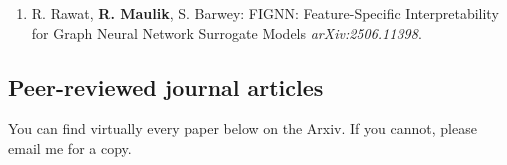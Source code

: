 \documentclass[letterpaper]{article}
\begin{document}
\begin{enumerate}



\item R. Rawat, \textbf{R. Maulik}, S. Barwey: FIGNN: Feature-Specific Interpretability for Graph Neural Network Surrogate Models {\it arXiv:2506.11398}.


\end{enumerate}


\subsection*{Peer-reviewed journal articles}

You can find virtually every paper below on the Arxiv. If you cannot, please email me for a copy.
\end{document}
